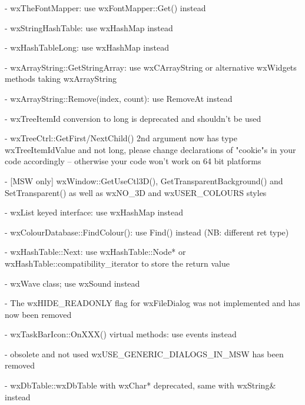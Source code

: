 - wxTheFontMapper: use wxFontMapper::Get() instead

- wxStringHashTable: use wxHashMap instead

- wxHashTableLong: use wxHashMap instead

- wxArrayString::GetStringArray: use wxCArrayString or alternative wxWidgets
                                 methods taking wxArrayString

- wxArrayString::Remove(index, count): use RemoveAt instead

- wxTreeItemId conversion to long is deprecated and shouldn't be used

- wxTreeCtrl::GetFirst/NextChild() 2nd argument now has type wxTreeItemIdValue
  and not long, please change declarations of "cookie"s in your code
  accordingly -- otherwise your code won't work on 64 bit platforms

- [MSW only] wxWindow::GetUseCtl3D(), GetTransparentBackground() and
             SetTransparent() as well as wxNO\_3D and wxUSER\_COLOURS styles

- wxList keyed interface: use wxHashMap instead

- wxColourDatabase::FindColour(): use Find() instead (NB: different ret type)

- wxHashTable::Next: use wxHashTable::Node* or
                     wxHashTable::compatibility\_iterator to store the return
                     value

- wxWave class; use wxSound instead

- The wxHIDE\_READONLY flag for wxFileDialog was not implemented
  and has now been removed

- wxTaskBarIcon::OnXXX() virtual methods: use events instead

- obsolete and not used wxUSE\_GENERIC\_DIALOGS\_IN\_MSW has been removed

- wxDbTable::wxDbTable with wxChar* deprecated, same with wxString& instead
